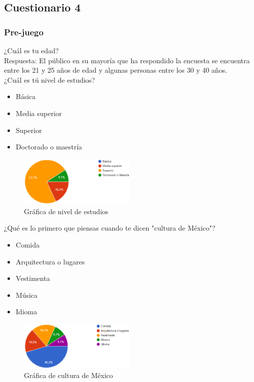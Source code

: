 \subsection{Cuestionario 4}

\subsubsection{Pre-juego}
	
	 ¿Cuál es tu edad? \\
	Respuesta: El público en su mayoría que ha respondido la encuesta se encuentra entre los 21 y 25 años de edad y algunas personas entre los 30 y 40 años. \\ 
	
	 ¿Cuál es tú nivel de estudios? \\
	\begin{itemize}
		\item Básica
		\item Media superior
		\item Superior
		\item Doctorado o maestría
	\end{itemize}

\begin{figure}
	\centering
	\caption{Gráfica de nivel de estudios}
	\label{fig:pre01}
	\includegraphics[width=0.5\textwidth]{04ResultadosObetnidos/pruebaR/imagenes/que/pre01}
\end{figure}

	
	 ¿Qué es lo primero que piensas cuando te dicen "cultura de México"?
	\begin{itemize}
		\item Comida
		\item Arquitectura o lugares
		\item Vestimenta
		\item Música
		\item Idioma	
	\end{itemize}

\begin{figure}
	\centering
	\caption{Gráfica de cultura de México}
	\label{fig:pre02}
	\includegraphics[width=0.5\textwidth]{04ResultadosObetnidos/pruebaR/imagenes/que/pre02}
\end{figure}

